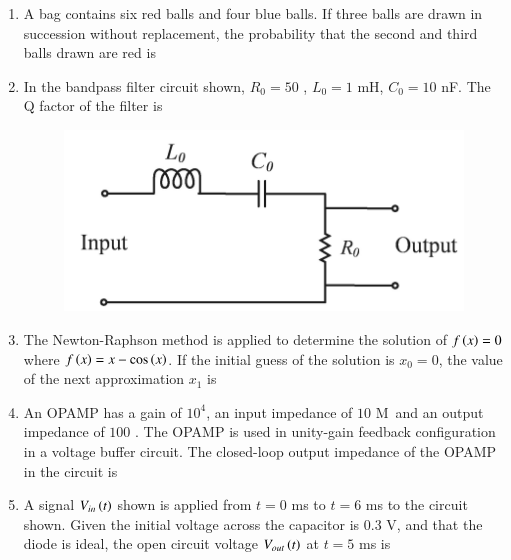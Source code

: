 \documentclass[journal,12pt,onecolumn]{IEEEtran}
\theoremstyle{remark}
\begin{document}
\begin{enumerate}
\item A bag contains six red balls and four blue balls. If three balls are drawn in succession without replacement, the probability that the second and third balls drawn are red is \underline{\hspace{2cm}} 

\hfill{}

\item In the bandpass filter circuit shown, $R_0 = 50$ \ohm, $L_0 = 1$ mH, $C_0 = 10$ nF. The Q factor of the filter is \underline{\hspace{2cm}} 

\hfill{}
\begin{figure}[H]
\includegraphics[width = 0.6\columnwidth]{q33}
\caption*{}
\label{fig:q33}
\end{figure}

\item The Newton-Raphson method is applied to determine the solution of $f\left(x\right) = 0$ where $f\left(x\right) = x - \cos \left(x\right)$. If the initial guess of the solution is $x_0 = 0$, the value of the next approximation $x_1$ is \underline{\hspace{2cm}} 

\hfill{}

\item An OPAMP has a gain of $10^4$, an input impedance of $10$ M\ohm \ and an output impedance of $100$ \ohm. The OPAMP is used in unity-gain feedback configuration in a voltage buffer circuit. The closed-loop output impedance of the OPAMP  in the circuit is \underline{\hspace{2cm}} 

\hfill{}

\item A signal $V_{in}\left(t\right)$ shown is applied from $t = 0$ ms to $t = 6$ ms to the circuit shown. Given the initial voltage across the capacitor is $0.3$ V, and that the diode is ideal, the open circuit voltage $V_{out}\left(t\right)$ at $t = 5$ ms is \underline{\hspace{2cm}}


\end{enumerate}
\end{document}
